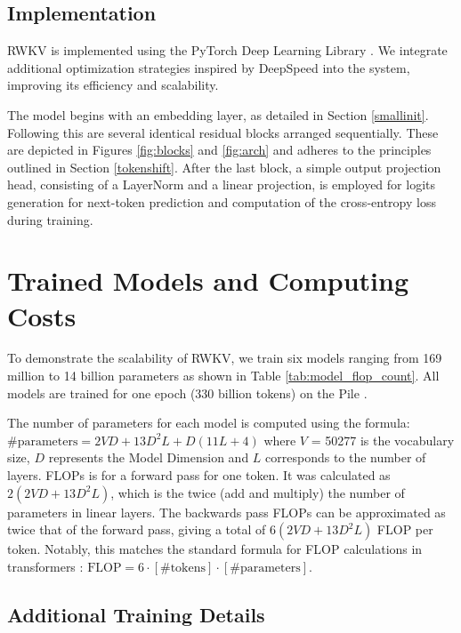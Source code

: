\subsection{Implementation}\label{detailed_implementation}

RWKV is implemented using the PyTorch Deep Learning Library \cite{paszke2019pytorch}. We integrate additional optimization strategies inspired by DeepSpeed \cite{10.1145/3394486.3406703} into the system, improving its efficiency and scalability.

The model begins with an embedding layer, as detailed in Section \ref{smallinit}. Following this are several identical residual blocks arranged sequentially. These are depicted in Figures \ref{fig:blocks} and \ref{fig:arch} and  adheres to the principles outlined in Section \ref{tokenshift}. After the last block, a simple output projection head, consisting of a LayerNorm \cite{ba2016layer} and a linear projection, is employed for logits generation for next-token prediction and  computation of the cross-entropy loss during training.

\section{Trained Models and Computing Costs}\label{appendix:flop_count}

To demonstrate the scalability of RWKV, we train six models ranging from 169 million to 14 billion parameters as shown in Table \ref{tab:model_flop_count}. All models are trained for one epoch (330 billion tokens) on the Pile \citep{gao2020pile,biderman2022datasheet}.

The number of parameters for each model is computed using the formula:  $\text{\# parameters} = 2VD + 13D^2L + D(11L+4)$ where $V$ = 50277 is the vocabulary size, $D$ represents the Model Dimension and $L$ corresponds to the number of layers. FLOPs is for a forward pass for one token. It was calculated as $2(2VD + 13D^2L)$, which is the twice (add and multiply) the number of parameters in linear layers. The backwards pass FLOPs can be approximated as twice that of the forward pass, giving a total of $6(2VD + 13D^2L)$ FLOP per token. Notably, this matches the standard formula for FLOP calculations in transformers \citet{kaplan2020scaling}: $\text{FLOP} = 6\cdot [\text{\# tokens}]\cdot [\text{\# parameters}]$.

\subsection{Additional Training Details}


